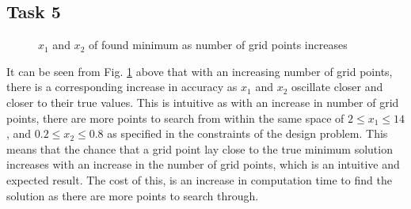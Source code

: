 \documentclass{article}
\begin{document}
\subsection{Task 5}
\FloatBarrier
\begin{figure}[h!]
\begin{adjustbox}{max width=1.5\linewidth,center}
    \centering
\end{adjustbox}
    \caption{$x_{1}$ and $x_{2}$ of found minimum as number of grid points increases}
    \label{fig:task5}%
\end{figure}
\FloatBarrier
\noindent It can be seen from Fig. \ref{fig:task5} above that with an increasing number of grid points, there is a corresponding increase in accuracy as $x_{1}$ and $x_{2}$ oscillate closer and closer to their true values. This is intuitive as with an increase in number of grid points, there are more points to search from within the same space of $2 \leq x_{1} \leq 14$, and $0.2 \leq x_{2} \leq 0.8$ as specified in the constraints of the design problem. This means that the chance that a grid point lay close to the true minimum solution increases with an increase in the number of grid points, which is an intuitive and expected result. The cost of this, is an increase in computation time to find the solution as there are more points to search through.
\end{document}
